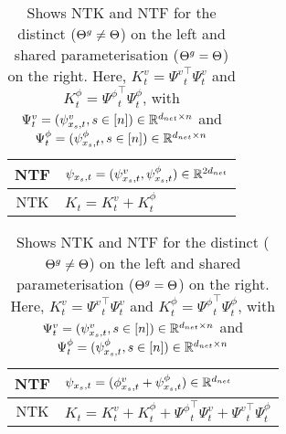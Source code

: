 \begin{table}[h]
\begin{minipage}{0.5\columnwidth}
\begin{tabular}{|c|l|}\hline								 								 													
NTF		&$\psi_{x_s,t}=(\psi^v_{x_s,t},\psi^{\phi}_{x_s,t})\in\mathbb{R}^{2d_{net}}$\\\hline
NTK 		&$K_t=K^v_t+K^{\phi}_t$\\\hline
\end{tabular}
\end{minipage}
\begin{minipage}{0.5\columnwidth}
\begin{tabular}{|c|l|}\hline								 								 													
NTF		&$\psi_{x_s,t}=(\phi^v_{x_s,t}+\psi^{\phi}_{x_s,t})\in\mathbb{R}^{d_{net}}$\\\hline
NTK 		&$K_t=K^v_t+K^{\phi}_t+{\Psi^{\phi}}^\top_t\Psi^v_t+ {\Psi^{v}}^\top_t\Psi^{\phi}_t$\\\hline
\end{tabular}
\end{minipage}
\caption{Shows NTK and NTF for the distinct (${\Theta}^g\neq\Theta$) on the left and shared parameterisation (${\Theta}^g=\Theta$) on the right. Here, $K^v_t={\Psi^{v}}^\top_t\Psi^v_t$ and $K^{\phi}_t={\Psi^{\phi}}^\top_t\Psi^{\phi}_t$, with $\Psi^v_t=(\psi^v_{x_s,t},s\in[n])\in\mathbb{R}^{d_{net}\times n}$ and $\Psi^{\phi}_t=(\psi^{\phi}_{x_s,t},s\in[n])\in\mathbb{R}^{d_{net}\times n}$}
\label{tb:terms}
\end{table}

\begin{comment}
The \textbf{neural tangent feature} (NTF) is given by $\psi_{x_s,t}=(\psi^v_{x_s,t},\psi^{\phi}_{x_s,t})\in\R^{2d_{net}}$, when the gating network is parameterised by $\Tg$ which is distinct from $\Theta$. When the parameters are shared ($\Tg_t=\Theta_t\forall t\geq 0$), then we have $\psi_{x_s,t}=(\phi^v_{x_s,t}+\psi^{\phi}_{x_s,t})\in\R^{d_{net}}$.\\
When the gating network is parameterised by $\Tg$ which is distinct from $\Theta$, the \textbf{neural tangent kernel} (NTK) matrix is given by $K_t=K^v_t+K^{\phi}_t$, where $K^v_t={\Psi^{v}}^\top_t\Psi^v_t$ and $K^{\phi}_t={\Psi^{\phi}}^\top_t\Psi^{\phi}_t$, with $\Psi^v_t=(\psi^v_{x_s,t},s\in[n])\in\R^{d_{net}\times n}$ and $\Psi^{\phi}_t=(\psi^{\phi}_{x_s,t},s\in[n])\in\R^{d_{net}\times n}$. In the case of shared parameterisation ($\Tg_t=\Theta_t\forall t\geq 0$), we have $K_t=K^v_t+K^{\phi}_t+{\Psi^{\phi}}^\top_t\Psi^v_t+ {\Psi^{v}}^\top_t\Psi^{\phi}_t$.
\end{comment}